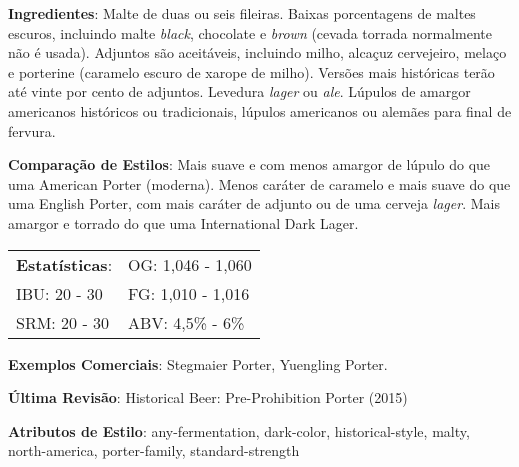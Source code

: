 \textbf{Ingredientes}: Malte de duas ou seis fileiras. Baixas porcentagens de maltes escuros, incluindo malte \textit{black}, chocolate e \textit{brown} (cevada torrada normalmente não é usada). Adjuntos são aceitáveis, incluindo milho, alcaçuz cervejeiro, melaço e porterine (caramelo escuro de xarope de milho). Versões mais históricas terão até vinte por cento de adjuntos. Levedura \textit{lager} ou \textit{ale}. Lúpulos de amargor americanos históricos ou tradicionais, lúpulos americanos ou alemães para final de fervura.

\textbf{Comparação de Estilos}: Mais suave e com menos amargor de lúpulo do que uma American Porter (moderna). Menos caráter de caramelo e mais suave do que uma English Porter, com mais caráter de adjunto ou de uma cerveja \textit{lager}. Mais amargor e torrado do que uma International Dark Lager.

\begin{tabular}{@{}p{35mm}p{35mm}@{}}
  \textbf{Estatísticas}: & OG: 1,046 - 1,060  \\
  IBU: 20 - 30  & FG: 1,010 - 1,016  \\
  SRM: 20 - 30 & ABV: 4,5\% - 6\%
\end{tabular}

\textbf{Exemplos Comerciais}: Stegmaier Porter, Yuengling Porter.

\textbf{Última Revisão}: Historical Beer: Pre-Prohibition Porter (2015)

\textbf{Atributos de Estilo}: any-fermentation, dark-color, historical-style, malty, north-america, porter-family, standard-strength

